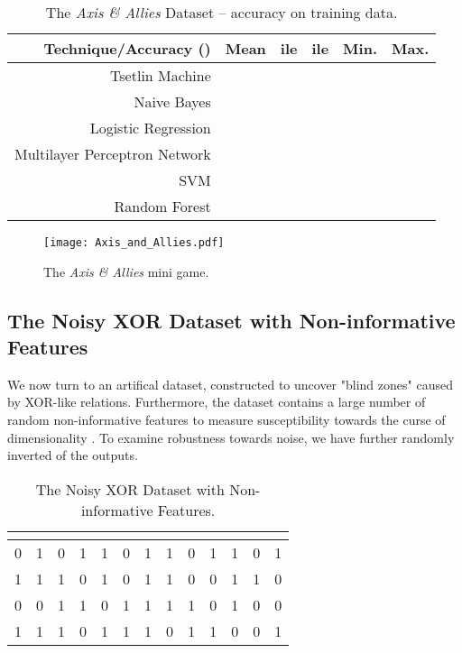 \documentclass[11pt,a4paper]{article}
\begin{document}
\begin{table}[!bh]
    \centering
    \begin{tabular}{r||c|c|c|c|c}
         \bf Technique/Accuracy ()&\bf Mean&\bf ile &\bf ile&\bf Min.&\bf Max.\\
         \hline
    Tsetlin Machine&&&&&\\
    Naive Bayes&&&&&\\
    Logistic Regression&&&&&\\
    Multilayer Perceptron Network&&&&&\\
    SVM&&&&&\\
    Random Forest&&&&&
    \end{tabular}
    \caption{The \emph{Axis \& Allies} Dataset -- accuracy on training data.}
    \label{tab:aa_training}
\end{table}

\begin{figure}[!th]
\centering
\texttt{[image: Axis\_and\_Allies.pdf]}
\caption{The \emph{Axis \& Allies} mini game.}
\label{figure:axis_and_allies_minigame}
\end{figure}

\subsection{The Noisy XOR Dataset with Non-informative Features}

We now turn to an artifical dataset, constructed to uncover "blind zones" caused by XOR-like relations. Furthermore, the dataset contains a large number of random non-informative features to measure susceptibility towards the curse of dimensionality \cite{Duda2000}. To examine robustness towards noise, we have further randomly inverted  of the outputs.

\begin{table}[!bh]
    \centering
    \begin{tabular}{c|c|c|c|c|c|c|c|c|c|c|c||c}
    \bf &\bf &\bf &\bf &\bf &\bf &\bf &\bf &\bf &\bf &\bf &\bf &\bf \\
    \hline
    \hline
    0&1&0&1&1&0&1&1&0&1&1&0&1\\
    1&1&1&0&1&0&1&1&0&0&1&1&0\\
    0&0&1&1&0&1&1&1&1&0&1&0&0\\
    1&1&1&0&1&1&1&0&1&1&0&0&1
    \end{tabular}
    \caption{The Noisy XOR Dataset with Non-informative Features.}
    \label{tab:noisy_xor_dataset}
\end{table}
\end{document}
